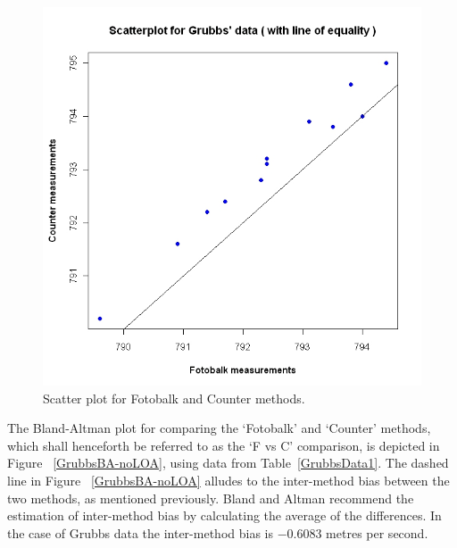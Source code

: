 \documentclass[12pt, a4paper]{report}
\theoremstyle{plain}
\theoremstyle{definition}
\theoremstyle{remark}
\begin{document}
	\begin{figure}[h!]
		\begin{center}
			\includegraphics[width=125mm]{images/GrubbsScatter.jpeg}
			\caption{Scatter plot for Fotobalk and Counter methods.}\label{GrubbsScatter}
		\end{center}
	\end{figure}


	
The Bland-Altman plot for comparing the `Fotobalk' and `Counter' methods, which shall henceforth be referred to as the `F vs C' comparison, is depicted in Figure ~\ref{GrubbsBA-noLOA}, using data from Table~\ref{GrubbsData1}. The dashed line in Figure ~\ref{GrubbsBA-noLOA} alludes to the inter-method bias between the two methods, as mentioned previously. Bland and Altman recommend the estimation of inter-method bias by calculating the	average of the differences. In the case of Grubbs data the inter-method bias is $-0.6083$ metres per second.
\end{document}
